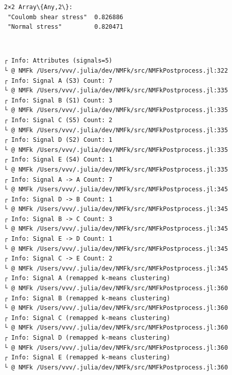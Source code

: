 \documentclass[11pt]{article}
\begin{document}
    
    
    \begin{Verbatim}[commandchars=\\\{\}]
2×2 Array\{Any,2\}:
 "Coulomb shear stress"  0.826886
 "Normal stress"         0.820471
    \end{Verbatim}

    
    \begin{center}
    \end{center}
    { \hspace*{\fill} \\}
    
    \begin{Verbatim}[commandchars=\\\{\}]
┌ Info: Attributes (signals=5)
└ @ NMFk /Users/vvv/.julia/dev/NMFk/src/NMFkPostprocess.jl:322
┌ Info: Signal A (S3) Count: 7
└ @ NMFk /Users/vvv/.julia/dev/NMFk/src/NMFkPostprocess.jl:335
┌ Info: Signal B (S1) Count: 3
└ @ NMFk /Users/vvv/.julia/dev/NMFk/src/NMFkPostprocess.jl:335
┌ Info: Signal C (S5) Count: 2
└ @ NMFk /Users/vvv/.julia/dev/NMFk/src/NMFkPostprocess.jl:335
┌ Info: Signal D (S2) Count: 1
└ @ NMFk /Users/vvv/.julia/dev/NMFk/src/NMFkPostprocess.jl:335
┌ Info: Signal E (S4) Count: 1
└ @ NMFk /Users/vvv/.julia/dev/NMFk/src/NMFkPostprocess.jl:335
┌ Info: Signal A -> A Count: 7
└ @ NMFk /Users/vvv/.julia/dev/NMFk/src/NMFkPostprocess.jl:345
┌ Info: Signal D -> B Count: 1
└ @ NMFk /Users/vvv/.julia/dev/NMFk/src/NMFkPostprocess.jl:345
┌ Info: Signal B -> C Count: 3
└ @ NMFk /Users/vvv/.julia/dev/NMFk/src/NMFkPostprocess.jl:345
┌ Info: Signal E -> D Count: 1
└ @ NMFk /Users/vvv/.julia/dev/NMFk/src/NMFkPostprocess.jl:345
┌ Info: Signal C -> E Count: 2
└ @ NMFk /Users/vvv/.julia/dev/NMFk/src/NMFkPostprocess.jl:345
┌ Info: Signal A (remapped k-means clustering)
└ @ NMFk /Users/vvv/.julia/dev/NMFk/src/NMFkPostprocess.jl:360
┌ Info: Signal B (remapped k-means clustering)
└ @ NMFk /Users/vvv/.julia/dev/NMFk/src/NMFkPostprocess.jl:360
┌ Info: Signal C (remapped k-means clustering)
└ @ NMFk /Users/vvv/.julia/dev/NMFk/src/NMFkPostprocess.jl:360
┌ Info: Signal D (remapped k-means clustering)
└ @ NMFk /Users/vvv/.julia/dev/NMFk/src/NMFkPostprocess.jl:360
┌ Info: Signal E (remapped k-means clustering)
└ @ NMFk /Users/vvv/.julia/dev/NMFk/src/NMFkPostprocess.jl:360
    \end{Verbatim}

    \begin{center}
    \end{center}
    { \hspace*{\fill} \\}
    
\end{document}
